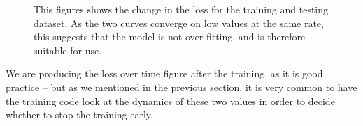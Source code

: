 \documentclass[
  letterpaper,
]{scrbook}
\begin{document}
\begin{figure}[pbt]


\caption{\label{fig-gradient-loss-comparison}This figures shows the
change in the loss for the training and testing dataset. As the two
curves converge on low values at the same rate, this suggests that the
model is not over-fitting, and is therefore suitable for use.}

\end{figure}%

We are producing the loss over time figure after the training, as it is
good practice -- but as we mentioned in the previous section, it is very
common to have the training code look at the dynamics of these two
values in order to decide whether to stop the training early.
\end{document}
